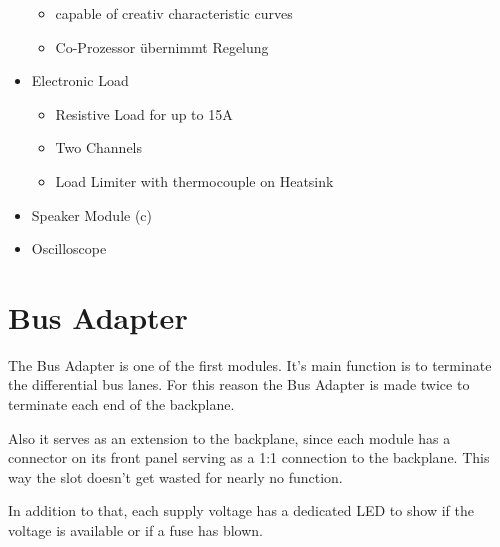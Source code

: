 \begin{itemize}
\begin{itemize}
		\item capable of creativ characteristic curves
		\item Co-Prozessor übernimmt Regelung
	\end{itemize}
	\item Electronic Load
	\begin{itemize}
		\item Resistive Load for up to 15A
		\item Two Channels
		\item Load Limiter with thermocouple on Heatsink
	\end{itemize}
	\item Speaker Module (c)
	\item Oscilloscope
\end{itemize}


\section{Bus Adapter}
The Bus Adapter is one of the first modules. It's main function is to terminate the differential bus lanes. For this reason the Bus Adapter is made twice to terminate each end of the backplane. 

Also it serves as an extension to the backplane, since each module has a connector on its front panel serving as a 1:1 connection to the backplane. This way the slot doesn't get wasted for nearly no function.

In addition to that, each supply voltage has a dedicated LED to show if the voltage is available or if a fuse has blown. 


